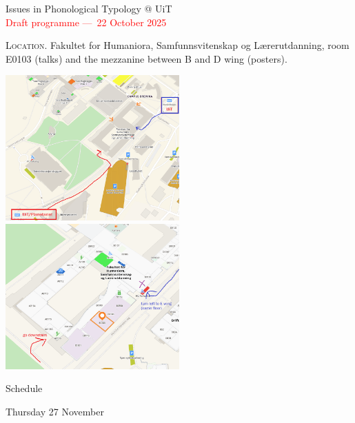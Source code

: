 \documentclass[11pt,a4paper]{article}
\begin{document}
\begin{center}
    {\LARGE Issues in Phonological Typology @ UiT} \\
    {\large \textcolor{red}{Draft programme — 22 October 2025}}
\end{center}

\textsc{Location.} Fakultet for Humaniora, Samfunnsvitenskap og Lærerutdanning, room E0103 (talks) and the mezzanine between B and D wing (posters). 

\includegraphics[width=0.5\textwidth]{map.png}
\includegraphics[width=0.5\textwidth]{map2.png}

\vspace{1cm}

\begin{center}
    {\Large Schedule}
\end{center}

{\large Thursday 27 November}
\end{document}
